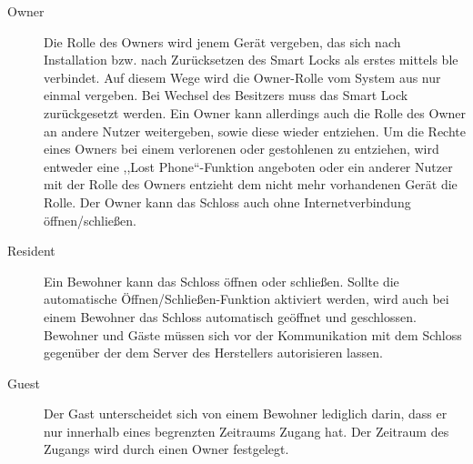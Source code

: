 		\begin{description}
		    \item [Owner] Die Rolle des Owners wird jenem Gerät vergeben, das sich nach Installation bzw. nach Zurücksetzen des Smart Locks als erstes mittels \gls{ble} verbindet. 
   		        Auf diesem Wege wird die Owner-Rolle vom System aus nur einmal vergeben. 
   		        Bei Wechsel des Besitzers muss das Smart Lock zurückgesetzt werden. 
   		        Ein Owner kann allerdings auch die Rolle des Owner an andere Nutzer weitergeben, sowie diese wieder entziehen. 
   		        Um die Rechte eines Owners bei einem verlorenen oder gestohlenen zu entziehen, wird entweder eine ,,Lost Phone``-Funktion angeboten oder ein anderer Nutzer mit der Rolle des Owners entzieht dem nicht mehr vorhandenen Gerät die Rolle. 
   		        Der Owner kann das Schloss auch ohne Internetverbindung öffnen/schließen. 
   	        \item [Resident] Ein Bewohner kann das Schloss öffnen oder schließen. 
   	            Sollte die automatische Öffnen/Schließen-Funktion aktiviert werden, wird auch bei einem Bewohner das Schloss automatisch geöffnet und geschlossen. 
   	            Bewohner und Gäste müssen sich vor der Kommunikation mit dem Schloss gegenüber der dem Server des Herstellers autorisieren lassen.
   	        \item [Guest] Der Gast unterscheidet sich von einem Bewohner lediglich darin, dass er nur innerhalb eines begrenzten Zeitraums Zugang hat. 
                Der Zeitraum des Zugangs wird durch einen Owner festgelegt.
		\end{description}
        
